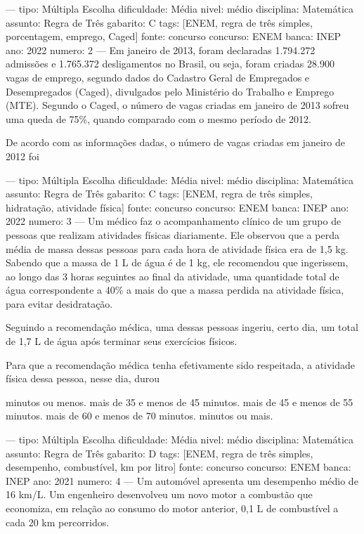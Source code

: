 ---
tipo: Múltipla Escolha
dificuldade: Média
nivel: médio
disciplina: Matemática
assunto: Regra de Três
gabarito: C
tags: [ENEM, regra de três simples, porcentagem, emprego, Caged]
fonte: concurso
concurso: ENEM
banca: INEP
ano: 2022
numero: 2
---
\question
Em janeiro de 2013, foram declaradas 1.794.272 admissões e 1.765.372 desligamentos no Brasil, ou seja, foram criadas 28.900 vagas de emprego, segundo dados do Cadastro Geral de Empregados e Desempregados (Caged), divulgados pelo Ministério do Trabalho e Emprego (MTE). Segundo o Caged, o número de vagas criadas em janeiro de 2013 sofreu uma queda de 75\%, quando comparado com o mesmo período de 2012.

De acordo com as informações dadas, o número de vagas criadas em janeiro de 2012 foi
\begin{choices}
\end{choices}

---
tipo: Múltipla Escolha
dificuldade: Média
nivel: médio
disciplina: Matemática
assunto: Regra de Três
gabarito: C
tags: [ENEM, regra de três simples, hidratação, atividade física]
fonte: concurso
concurso: ENEM
banca: INEP
ano: 2022
numero: 3
---
\question
Um médico faz o acompanhamento clínico de um grupo de pessoas que realizam atividades físicas diariamente. Ele observou que a perda média de massa dessas pessoas para cada hora de atividade física era de 1,5 kg. Sabendo que a massa de 1 L de água é de 1 kg, ele recomendou que ingerissem, ao longo das 3 horas seguintes ao final da atividade, uma quantidade total de água correspondente a 40\% a mais do que a massa perdida na atividade física, para evitar desidratação.

Seguindo a recomendação médica, uma dessas pessoas ingeriu, certo dia, um total de 1,7 L de água após terminar seus exercícios físicos.

Para que a recomendação médica tenha efetivamente sido respeitada, a atividade física dessa pessoa, nesse dia, durou
\begin{choices}
 minutos ou menos.
\choice mais de 35 e menos de 45 minutos.
\CorrectChoice mais de 45 e menos de 55 minutos.
\choice mais de 60 e menos de 70 minutos.
 minutos ou mais.
\end{choices}

---
tipo: Múltipla Escolha
dificuldade: Média
nivel: médio
disciplina: Matemática
assunto: Regra de Três
gabarito: D
tags: [ENEM, regra de três simples, desempenho, combustível, km por litro]
fonte: concurso
concurso: ENEM
banca: INEP
ano: 2021
numero: 4
---
\question
Um automóvel apresenta um desempenho médio de 16 km/L. Um engenheiro desenvolveu um novo motor a combustão que economiza, em relação ao consumo do motor anterior, 0,1 L de combustível a cada 20 km percorridos.

